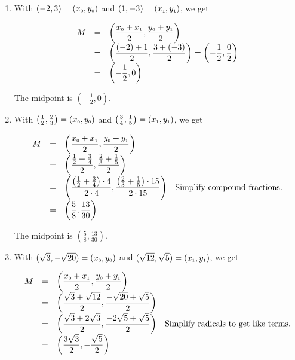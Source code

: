 \documentclass{ximera}
\begin{document}
\begin{example}
\begin{enumerate}
\item  With $(-2,3) =  \left(x_{\mbox{\tiny$0$}}, y_{\mbox{\tiny$0$}}\right)$ and  $(1,-3) = \left(x_{\mbox{\tiny$1$}}, y_{\mbox{\tiny$1$}}\right)$, we get

\setlength{\extrarowheight}{10pt}

\[ \begin{array}{rcl}
 M & = & \left( \dfrac{x_{\mbox{\tiny$0$}}+x_{\mbox{\tiny$1$}}}{2},  \dfrac{y_{\mbox{\tiny$0$}}+y_{\mbox{\tiny$1$}}}{2} \right) \\
   & = & \left( \dfrac{(-2)+1}{2},  \dfrac{3+(-3)}{2} \right)  = \left(- \dfrac{1}{2}, \dfrac{0}{2} \right) \\
   & = & \left(- \dfrac{1}{2}, 0 \right) 
   \end{array} \]
   
The midpoint is  $\left(- \frac{1}{2}, 0 \right)$.  

\item With $\left( \frac{1}{2}, \frac{2}{3}\right) =  \left(x_{\mbox{\tiny$0$}}, y_{\mbox{\tiny$0$}}\right)$ and  $\left( \frac{3}{4}, \frac{1}{5}\right) = \left(x_{\mbox{\tiny$1$}}, y_{\mbox{\tiny$1$}}\right)$, we get

\setlength{\extrarowheight}{10pt}

\[ \begin{array}{rclr}
 M & = & \left( \dfrac{x_{\mbox{\tiny$0$}}+x_{\mbox{\tiny$1$}}}{2},  \dfrac{y_{\mbox{\tiny$0$}}+y_{\mbox{\tiny$1$}}}{2} \right) & \\
   & = & \left( \dfrac{\frac{1}{2} + \frac{3}{4}}{2},  \dfrac{\frac{2}{3} + \frac{1}{5}}{2} \right) &   \\
   & = &  \left( \dfrac{\left(\frac{1}{2} + \frac{3}{4}\right) \cdot 4}{2 \cdot 4},  \dfrac{\left(\frac{2}{3} + \frac{1}{5}\right) \cdot 15}{2 \cdot 15} \right) & \text{Simplify compound fractions.} \\ 
   & = & \left(\dfrac{5}{8}, \dfrac{13}{30} \right) &  \end{array} \]
   
   

The midpoint is $\left(\frac{5}{8}, \frac{13}{30} \right)$.

\item   With $(\sqrt{3}, -\sqrt{20}) =  \left(x_{\mbox{\tiny$0$}}, y_{\mbox{\tiny$0$}}\right)$ and  $(\sqrt{12}, \sqrt{5}) = \left(x_{\mbox{\tiny$1$}}, y_{\mbox{\tiny$1$}}\right)$, we get

\setlength{\extrarowheight}{10pt}

\[ \begin{array}{rclr}
 M & = & \left( \dfrac{x_{\mbox{\tiny$0$}}+x_{\mbox{\tiny$1$}}}{2},  \dfrac{y_{\mbox{\tiny$0$}}+y_{\mbox{\tiny$1$}}}{2} \right) & \\
   & = & \left( \dfrac{\sqrt{3} + \sqrt{12}}{2},  \dfrac{-\sqrt{20}+\sqrt{5}}{2} \right) &   \\
   & = &  \left( \dfrac{\sqrt{3}+2\sqrt{3}}{2},  \dfrac{-2\sqrt{5} + \sqrt{5}}{2} \right) & \text{Simplify radicals to get like terms.} \\ 
   & = & \left(\dfrac{3\sqrt{3}}{2}, -\dfrac{\sqrt{5}}{2} \right) &  \end{array} \]
   

\end{enumerate}
\end{example}
\end{document}
